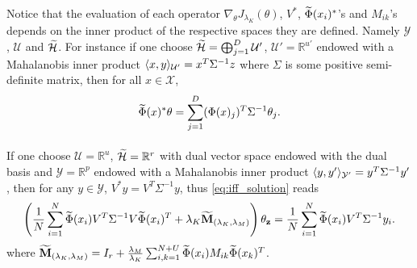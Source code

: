 \begin{remark}
\label{rq:mahalanobis}
Notice that the evaluation of each operator $\nabla_{\theta} J_{\lambda_K}(\theta)$, $V^*$, $\widetilde{\Phi}(x_i)^*$'s and $M_{ik}$'s depends on the inner product of the respective spaces they are defined. Namely $\mathcal{Y}$, $\mathcal{U}$ and $\widetilde{\mathcal{H}}$. For instance if one choose $\widetilde{\mathcal{H}}=\operatorname{\bigoplus}_{j=1}^D \mathcal{U}'$, $\mathcal{U}'=\mathbb{R}^{u'}$ endowed with a Mahalanobis inner product $\langle x,y\rangle_{\mathcal{U}'}=x^T\Sigma^{-1} z$ where $\Sigma$ is some positive semi-definite matrix, then for all $x\in\mathcal{X}$,
\begin{dmath*}
\tildePhi{\omega}(x)^*\theta=\sum_{j=1}^D(\Phi(x)_j)^T \Sigma^{-1}\theta_j.
\end{dmath*}
\paragraph{}
If one choose $\mathcal{U}=\mathbb{R}^u$, $\widetilde{\mathcal{H}}=\mathbb{R}^{r}$ with dual vector space endowed with the dual basis and $\mathcal{Y}=\mathbb{R}^p$ endowed with a Mahalanobis inner product $\langle y,y'\rangle_{\mathcal{Y}'}=y^T\Sigma^{-1} y'$, then for any $y\in\mathcal{Y}$, $V^*y=V^T\Sigma^{-1}y$, thus \cref{eq:iff_solution} reads
\begin{dmath*}
\left(\frac{1}{N}\sum_{i=1}^N \tildePhi{\omega}(x_i)V^T \Sigma^{-1}V\tildePhi{\omega}(x_i)^T + \lambda_K\mathbf{\widetilde{M}}_{\left(\lambda_K,\lambda_M\right)}\right)\theta_{\seq{z}} = \frac{1}{N}\sum_{i=1}^N \tildePhi{\omega}(x_i)V^T \Sigma^{-1} y_i.
\end{dmath*}
where $\mathbf{\widetilde{M}}_{\left(\lambda_K,\lambda_M\right)}=I_{r} + \frac{\lambda_M}{\lambda_K}\sum_{i,k=1}^{N+U}\widetilde{\Phi}(x_i)M_{ik}\widetilde{\Phi}(x_k)^T$.
\end{remark}
